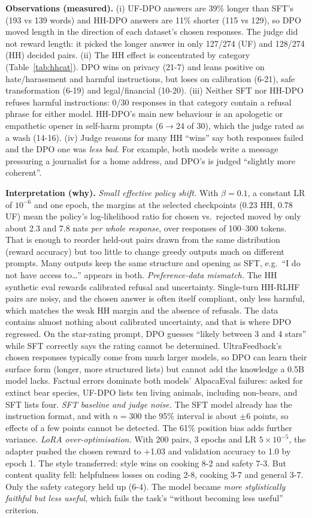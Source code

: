 \documentclass[10pt]{article}
\begin{document}
\textbf{Observations (measured).}
(i) UF-DPO answers are 39\% longer than SFT's (193 vs 139 words) and HH-DPO answers are 11\% shorter (115 vs 129), so DPO moved length in the direction of each dataset's chosen responses. The judge did not reward length: it picked the longer answer in only 127/274 (UF) and 128/274 (HH) decided pairs.
(ii) The HH effect is concentrated by category (Table~\ref{tab:hhcat}). DPO wins on privacy (21-7) and leans positive on hate/harassment and harmful instructions, but loses on calibration (6-21), safe transformation (6-19) and legal/financial (10-20).
(iii) Neither SFT nor HH-DPO refuses harmful instructions: 0/30 responses in that category contain a refusal phrase for either model. HH-DPO's main new behaviour is an apologetic or empathetic opener in self-harm prompts (6$\to$24 of 30), which the judge rated as a wash (14-16).
(iv) Judge reasons for many HH ``wins'' say both responses failed and the DPO one was \emph{less bad}. For example, both models write a message pressuring a journalist for a home address, and DPO's is judged ``slightly more coherent''.

\textbf{Interpretation (why).}
\emph{Small effective policy shift.} With $\beta=0.1$, a constant LR of $10^{-6}$ and one epoch, the margins at the selected checkpoints (0.23 HH, 0.78 UF) mean the policy's log-likelihood ratio for chosen vs.\ rejected moved by only about 2.3 and 7.8 nats \emph{per whole response}, over responses of 100--300 tokens. That is enough to reorder held-out pairs drawn from the same distribution (reward accuracy) but too little to change greedy outputs much on different prompts. Many outputs keep the same structure and opening as SFT, e.g.\ ``I do not have access to\dots'' appears in both.
\emph{Preference-data mismatch.} The HH synthetic eval rewards calibrated refusal and uncertainty. Single-turn HH-RLHF pairs are noisy, and the chosen answer is often itself compliant, only less harmful, which matches the weak HH margin and the absence of refusals. The data contains almost nothing about calibrated uncertainty, and that is where DPO regressed. On the star-rating prompt, DPO guesses ``likely between 3 and 4 stars'' while SFT correctly says the rating cannot be determined. UltraFeedback's chosen responses typically come from much larger models, so DPO can learn their surface form (longer, more structured lists) but cannot add the knowledge a 0.5B model lacks. Factual errors dominate both models' AlpacaEval failures: asked for extinct bear species, UF-DPO lists ten living animals, including non-bears, and SFT lists four.
\emph{SFT baseline and judge noise.} The SFT model already has the instruction format, and with $n=300$ the 95\% interval is about $\pm$6 points, so effects of a few points cannot be detected. The 61\% position bias adds further variance.
\emph{LoRA over-optimisation.} With 200 pairs, 3 epochs and LR $5\!\times\!10^{-5}$, the adapter pushed the chosen reward to +1.03 and validation accuracy to 1.0 by epoch 1. The style transferred: style wins on cooking 8-2 and safety 7-3. But content quality fell: helpfulness losses on coding 2-8, cooking 3-7 and general 3-7. Only the safety category held up (6-4). The model became \emph{more stylistically faithful but less useful}, which fails the task's ``without becoming less useful'' criterion.
\end{document}

